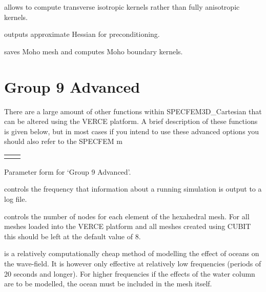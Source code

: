\documentclass[english]{book}
\begin{document}
 allows to compute transverse isotropic kernels
rather than fully anisotropic kernels.

 outputs approximate Hessian for
preconditioning.

 saves Moho mesh and computes Moho boundary kernels.


\section{Group 9 \textendash{} Advanced}
\label{\detokenize{Appendix1:a1-10-group-9-advanced}}
There are a large amount of other functions within SPECFEM3D\_Cartesian
that can be altered using the VERCE platform. A brief description of
these functions is given below, but in most cases if you intend to use
these advanced options you should also refer to the SPECFEM m


\begin{savenotes}\sphinxattablestart
\centering
\begin{tabulary}{\linewidth}[t]{T T}

&
\\

\end{tabulary}
\par
\sphinxattableend\end{savenotes}

\begin{center} Parameter form for ‘Group 9 \textendash{} Advanced’.
\end{center}
 controls the frequency that
information about a running simulation is output to a log file.

 controls the number of nodes for each element of the
hexahedral mesh. For all meshes loaded into the VERCE platform and all
meshes created using CUBIT this should be left at the default value of
8.

 is a relatively computationally cheap method
of modelling the effect of oceans on the wave-field. It is however only
effective at relatively low frequencies (periods of 20 seconds and
longer). For higher frequencies if the effects of the water column are
to be modelled, the ocean must be included in the mesh itself.
\end{document}
